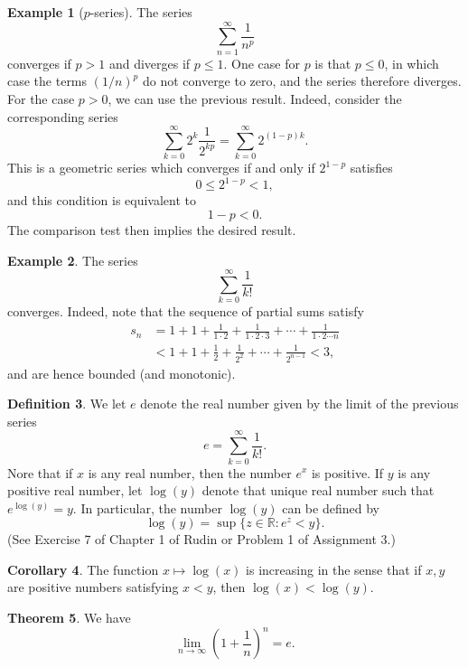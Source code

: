 \documentclass[12pt]{article}
\theoremstyle{definition}
\newtheorem{definition}{Definition}
\newtheorem{example}[definition]{Example}
\theoremstyle{theorem}
\newtheorem{theorem}[definition]{Theorem}
\newtheorem{corollary}[definition]{Corollary}
\begin{document}
\begin{example}[$p$-series]
The series 
\[
\sum_{n=1}^\infty \frac{1}{n^p}
\]
converges if $p > 1$ and diverges if $p \leqslant 1$. One case for $p$ is that $p \leqslant 0$, in which case the terms $(1/n)^p$ do not converge to zero, and the series therefore diverges. For the case $p > 0$, we can use the previous result. Indeed, consider the corresponding series 
\[
\sum_{k=0}^\infty 2^k \frac{1}{2^{kp}} = \sum_{k=0}^\infty 2^{(1-p)k}.
\]
This is a geometric series which converges if and only if $2^{1-p}$ satisfies  
\[
0 \leqslant 2^{1-p} < 1,
\]
and this condition is equivalent to 
\[
1 - p < 0.
\]
The comparison test then implies the desired result. 
\end{example}

\begin{example}
The series 
\[
\sum_{k=0}^\infty \frac{1}{k!}
\]
converges. Indeed, note that the sequence of partial sums satisfy
\begin{align*}
s_n &= 1 + 1 + \frac{1}{1 \cdot 2} + \frac{1}{1 \cdot 2 \cdot 3} + \cdots + \frac{1}{1 \cdot 2 \cdots n} \\
&< 1 + 1 + \frac{1}{2} + \frac{1}{2^2} + \cdots + \frac{1}{2^{n-1}} < 3,
\end{align*}
and are hence bounded (and monotonic). 
\end{example}

\begin{definition}
We let $e$ denote the real number given by the limit of the previous series
\[
e = \sum_{k=0}^\infty \frac{1}{k!}.
\]
Nore that if $x$ is any real number, then the number $e^x$ is positive. If $y$ is any positive real number, let $\log(y)$ denote that unique real number such that $e^{\log(y)} = y$. In particular, the number $\log (y)$ can be defined by 
\[
\log(y) = \sup \{z \in \mathbb{R} : e^z < y \}.
\]
(See Exercise 7 of Chapter 1 of Rudin or Problem 1 of Assignment 3.)
\end{definition}

\begin{corollary}
The function $x \mapsto \log(x)$ is increasing in the sense that if $x,y$ are positive numbers satisfying $x < y$, then $\log(x) < \log(y)$. 
\end{corollary}

\begin{theorem}
We have 
\[
\lim_{n \to \infty}\left(1 + \frac{1}{n}\right)^n = e.
\]
\end{theorem}
\end{document}
